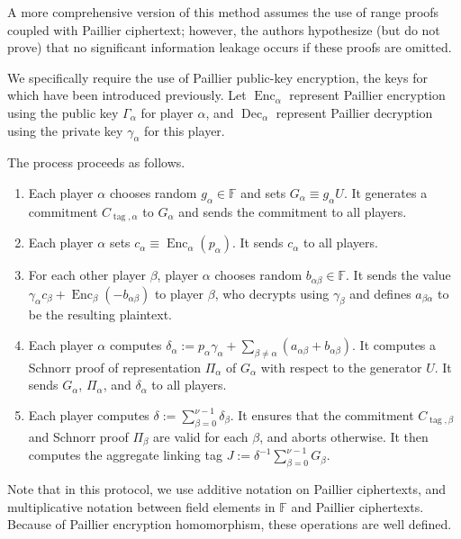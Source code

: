 \documentclass{article}
\newcommand{\F}{\mathbb{F}}
\newcommand{\enc}{\operatorname{Enc}}
\newcommand{\dec}{\operatorname{Dec}}
\begin{document}
A more comprehensive version of this method assumes the use of range proofs coupled with Paillier ciphertext; however, the authors hypothesize (but do not prove) that no significant information leakage occurs if these proofs are omitted.

We specifically require the use of Paillier public-key encryption, the keys for which have been introduced previously.
Let $\enc_\alpha$ represent Paillier encryption using the public key $\Gamma_\alpha$ for player $\alpha$, and $\dec_\alpha$ represent Paillier decryption using the private key $\gamma_\alpha$ for this player.

The process proceeds as follows.
\begin{enumerate}
    \item Each player $\alpha$ chooses random $g_\alpha \in \F$ and sets $G_\alpha \equiv g_\alpha U$.
    It generates a commitment $C_{\operatorname{tag},\alpha}$ to $G_\alpha$ and sends the commitment to all players.
    \item Each player $\alpha$ sets $c_\alpha \equiv \enc_\alpha(p_\alpha)$. It sends $c_\alpha$ to all players.
    \item For each other player $\beta$, player $\alpha$ chooses random $b_{\alpha\beta} \in \F$.
    It sends the value $\gamma_\alpha c_\beta + \enc_\beta(-b_{\alpha\beta})$ to player $\beta$, who decrypts using $\gamma_\beta$ and defines $a_{\beta\alpha}$ to be the resulting plaintext.
    \item Each player $\alpha$ computes $\delta_\alpha := p_\alpha \gamma_\alpha + \sum_{\beta \neq \alpha}(a_{\alpha\beta} + b_{\alpha\beta})$.
    It computes a Schnorr proof of representation $\Pi_\alpha$ of $G_\alpha$ with respect to the generator $U$.
    It sends $G_\alpha$, $\Pi_\alpha$, and $\delta_\alpha$ to all players.
    \item Each player computes $\delta := \sum_{\beta=0}^{\nu-1} \delta_\beta$.
    It ensures that the commitment $C_{\operatorname{tag},\beta}$ and Schnorr proof $\Pi_\beta$ are valid for each $\beta$, and aborts otherwise.
    It then computes the aggregate linking tag $J := \delta^{-1} \sum_{\beta=0}^{\nu-1} G_\beta$.
\end{enumerate}

Note that in this protocol, we use additive notation on Paillier ciphertexts, and multiplicative notation between field elements in $\F$ and Paillier ciphertexts.
Because of Paillier encryption homomorphism, these operations are well defined.
\end{document}
